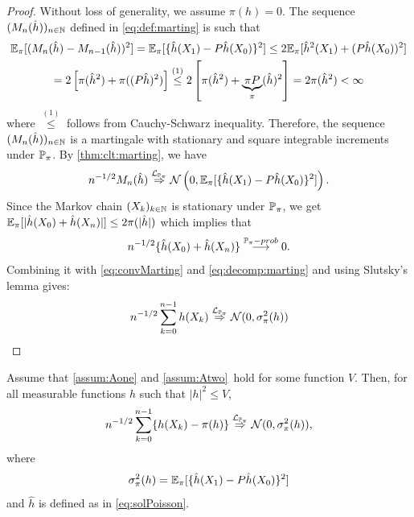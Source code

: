 \documentclass[english,graybox,envcountchap,envcountsame,sectrefs,shortlabels]{svmono}
\theoremstyle{style}
\newcommand{\dlim}[1]{\stackrel{\mathcal{L}_{#1}}{\Rightarrow}}
\newcommand{\plim}[1]{\stackrel{#1-prob}{\longrightarrow}}
\newcommand{\gauss}{\mathcal{N}}
\newcommand{\eqsp}{}
\begin{document}
\begin{proof}
Without loss of generality, we assume $\pi(h)=0$.
  The sequence $(M_n(\hat h))_{n \in \mathbb{N}}$ defined in
  \eqref{eq:def:marting} is such that
  \begin{multline*}
\mathbb{E}_\pi[(M_n(\hat h)-M_{n-1}(\hat h))^2]=\mathbb{E}_\pi[ \{\hat{h}(X_1)-P\hat{h}(X_0)\}^2] \leq 2 \mathbb{E}_\pi[ \hat{h}^2(X_1)+(P\hat{h}(X_0))^2]  \\
= 2 \left[\pi(\hat h^2) +\pi( (P\hat h)^2)\right]  \stackrel{(1)}{\leq} 2 \left[\pi(\hat h^2) +\underbrace{\pi P}_{\pi}(\hat h)^2\right]=2\pi(\hat h^2)<\infty
  \end{multline*}
  where $\stackrel{(1)}{\leq}$ follows from Cauchy-Schwarz inequality.
 Therefore,  the sequence $(M_n(\hat h))_{n \in \mathbb{N}}$ is a martingale with stationary and square integrable increments under $\mathbb{P}_\pi$. By \autoref{thm:clt:marting}, we have
  \begin{equation} \label{eq:convMarting}
  n^{-1/2} M_n(\hat h) \dlim{\PP_\pi} \gauss\left(0, \PE_\pi[ \{\hat{h}(X_1)-P\hat{h}(X_0)\}^2] \right) \eqsp.
  \end{equation}
 Since the Markov chain $(X_k)_{k\in\mathbb{N}}$ is stationary under $\mathbb{P}_\pi$, we get
  $\mathbb{E}_\pi[|\hat{h}(X_0)+\hat{h}(X_n)|] \leq 2 \pi(|\hat{h}|)$ which implies that
  \[
  n^{-1/2} \{\hat{h}(X_0)+\hat{h}(X_n)\}\plim{\PP_\pi}0 \eqsp.
  \]
Combining it with \eqref{eq:convMarting} and \eqref{eq:decomp:marting} and using Slutsky's lemma gives:
$$
    n^{-1/2} \sum_{k=0}^{n-1} h(X_k) \dlim{\PP_\pi} \gauss(0,\sigma_\pi^2(h))
$$
\end{proof}

\begin{theorem} \label{thm:clrHairer}
Assume that \ref{assum:Aone} and \ref{assum:Atwo}\ hold for some function $V$. Then, for all measurable functions $h$ such that $|h|^2\leq V$,
  \begin{align*}
    n^{-1/2} \sum_{k=0}^{n-1} \{h(X_k)-\pi(h)\}  \dlim{\PP_\pi} \gauss(0,\sigma_\pi^2(h)) \eqsp ,
  \end{align*}
  where
  \begin{equation}
  \label{eq:equality-variance}
  \sigma_\pi^2(h) = \PE_\pi[ \{\hat{h}(X_1)-P\hat{h}(X_0)\}^2] %
  \end{equation}
and $\hat h$ is defined as in \eqref{eq:solPoisson}.
\end{theorem}
\end{document}
